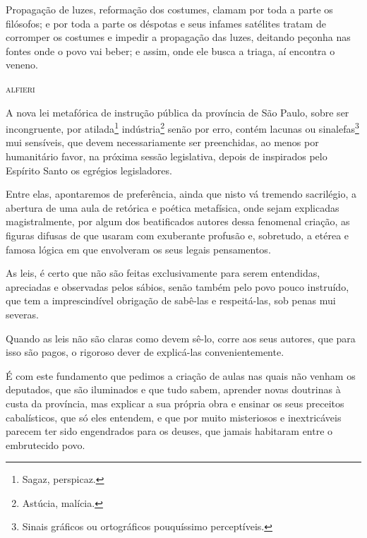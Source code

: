 \epigraph{Propagação de luzes, reformação dos costumes, clamam por toda a parte os
filósofos; e por toda a parte os déspotas e seus infames satélites
tratam de corromper os costumes e impedir a propagação das luzes,
deitando peçonha nas fontes onde o povo vai beber; e assim, onde ele
busca a triaga,\footnotemark{} aí encontra o veneno.}{\textsc{alfieri}\footnotemark}



A nova lei metafórica de instrução pública da província de São Paulo,
sobre ser incongruente, por atilada\footnote{Sagaz, perspicaz.}
indústria\footnote{Astúcia, malícia.} senão por erro, contém lacunas
ou sinalefas\footnote{Sinais gráficos ou ortográficos pouquíssimo
  perceptíveis.} mui sensíveis, que devem necessariamente ser
preenchidas, ao menos por humanitário favor, na próxima sessão
legislativa, depois de inspirados pelo Espírito Santo os egrégios
legisladores.

Entre elas, apontaremos de preferência, ainda que nisto vá tremendo
sacrilégio, a abertura de uma aula de retórica e poética metafísica,
onde sejam explicadas magistralmente, por algum dos beatificados autores
dessa fenomenal criação, as figuras difusas de que usaram com exuberante
profusão e, sobretudo, a etérea e famosa lógica em que envolveram os
seus legais pensamentos.

As leis, é certo que não são feitas exclusivamente para serem
entendidas, apreciadas e observadas pelos sábios, senão também pelo povo
pouco instruído, que tem a imprescindível obrigação de sabê-las e
respeitá-las, sob penas mui severas.

Quando as leis não são claras como devem sê-lo, corre aos seus autores,
que para isso são pagos, o rigoroso dever de explicá-las
convenientemente.

É com este fundamento que pedimos a criação de aulas nas quais não
venham os deputados, que são iluminados e que tudo sabem, aprender novas
doutrinas à custa da província, mas explicar a sua própria obra e
ensinar os seus preceitos cabalísticos, que só eles entendem, e que por
muito misteriosos e inextricáveis parecem ter sido engendrados para os
deuses, que jamais habitaram entre o embrutecido povo.

